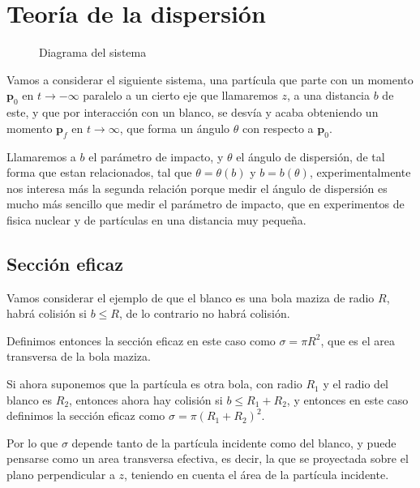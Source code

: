 \chapter{Teoría de la dispersión}
\begin{marginfigure}[0pt]
    \def\svgwidth{3.5 cm}
    \small
    \vspace{20pt}
	
\end{marginfigure}
\begin{figure}[H]
    \def\svgwidth{15 cm}
    \normalsize
	
    \vspace{15pt}
    \caption{Diagrama del sistema}
\end{figure}
\vspace{15pt}

Vamos a considerar el siguiente sistema, una partícula que parte con un momento $\mathbf{p}_0$ en $t\rightarrow -\infty$ paralelo a un cierto eje que llamaremos $z$, a una distancia $b$ de este, y que por interacción con un blanco, se desvía y acaba obteniendo un momento $\mathbf{p}_f$ en $t\rightarrow \infty$, que forma un ángulo $\theta$ con respecto a $\mathbf{p}_0$.

Llamaremos a $b$ el parámetro de impacto, y $\theta$ el ángulo de dispersión, de tal forma que estan relacionados, tal que $\theta = \theta(b)$ y $b = b(\theta)$, experimentalmente nos interesa más la segunda relación porque medir el ángulo de dispersión es mucho más sencillo que medir el parámetro de impacto, que en experimentos de fisica nuclear y de partículas en una distancia muy pequeña.

\section{Sección eficaz} 
Vamos considerar el ejemplo de que el blanco es una bola maziza de radio $R$, habrá colisión si $b \leq R$, de lo contrario no habrá colisión.

Definimos entonces la sección eficaz en este caso como $\sigma=\pi R^2$, que es el area transversa de la bola maziza.

Si ahora suponemos que la partícula es otra bola, con radio $R_1$ y el radio del blanco es $R_2$, entonces ahora hay colisión si $b \leq R_1+R_2$, y entonces en este caso definimos la sección eficaz como $\sigma=\pi (R_1+R_2)^2$.

Por lo que $\sigma$ depende tanto de la partícula incidente como del blanco, y puede pensarse como un area transversa efectiva, es decir, la que se proyectada sobre el plano perpendicular a $z$, teniendo en cuenta el área de la partícula incidente.

